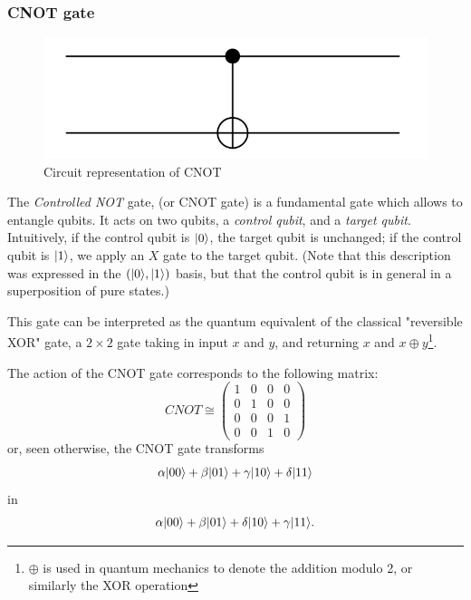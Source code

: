 \documentclass[12pt,a4paper]{article}
\theoremstyle{plain}
\theoremstyle{definition}
\DeclarePairedDelimiter\ket{\lvert}{\rangle}
\begin{document}
\subsubsection{CNOT gate}
\begin{figure}
    \centering
    \includegraphics*[scale=0.5]{cnot.png}
    \caption{Circuit representation of CNOT}
\end{figure}
The \emph{Controlled NOT} gate, (or CNOT gate) is a fundamental gate which allows to entangle qubits. It acts on two qubits, a \emph{control qubit}, and a \emph{target qubit}. Intuitively, if the control qubit is $\ket{0}$, the target qubit is unchanged; if the control qubit is $\ket{1}$, we apply an $X$ gate to the target qubit. (Note that this description was expressed in the $(\ket{0}, \ket{1})$ basis, but that the control qubit is in general in a superposition of pure states.) 

This gate can be interpreted as the quantum equivalent of the classical "reversible XOR" gate, a $2\times 2$ gate taking in input $x$ and $y$, and returning $x$ and $x\oplus y$\footnote{$\oplus$ is used in quantum mechanics to denote the addition modulo 2, or similarly the XOR operation}.

The action of the CNOT gate corresponds to the following matrix:
\begin{equation*}
    CNOT \cong \begin{pmatrix}
        1&0&0&0\\
        0&1&0&0\\
        0&0&0&1\\
        0&0&1&0
    \end{pmatrix}
\end{equation*}
or, seen otherwise, the CNOT gate transforms
\begin{equation*}
    \alpha\ket{00}+\beta\ket{01}+\gamma\ket{10}+\delta\ket{11}
\end{equation*}
in
\begin{equation*}
    \alpha\ket{00}+\beta\ket{01}+\delta\ket{10}+\gamma\ket{11}.
\end{equation*}
\end{document}
